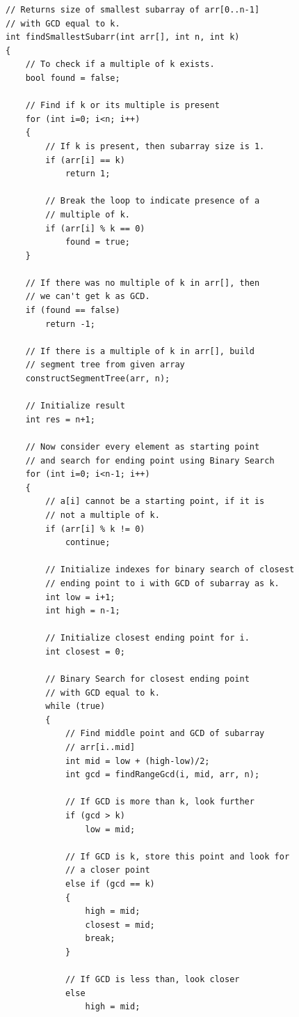 \documentclass[8pt, a4paper, oneside, twocolumn]{extarticle}
\begin{document}
\begin{verbatim}
// Returns size of smallest subarray of arr[0..n-1] 
// with GCD equal to k. 
int findSmallestSubarr(int arr[], int n, int k) 
{ 
    // To check if a multiple of k exists. 
    bool found = false; 
  
    // Find if k or its multiple is present 
    for (int i=0; i<n; i++) 
    { 
        // If k is present, then subarray size is 1. 
        if (arr[i] == k) 
            return 1; 
  
        // Break the loop to indicate presence of a 
        // multiple of k. 
        if (arr[i] % k == 0) 
            found = true; 
    } 
  
    // If there was no multiple of k in arr[], then 
    // we can't get k as GCD. 
    if (found == false) 
        return -1; 
  
    // If there is a multiple of k in arr[], build 
    // segment tree from given array 
    constructSegmentTree(arr, n); 
  
    // Initialize result 
    int res = n+1; 
  
    // Now consider every element as starting point 
    // and search for ending point using Binary Search 
    for (int i=0; i<n-1; i++) 
    { 
        // a[i] cannot be a starting point, if it is 
        // not a multiple of k. 
        if (arr[i] % k != 0) 
            continue; 
  
        // Initialize indexes for binary search of closest 
        // ending point to i with GCD of subarray as k. 
        int low = i+1; 
        int high = n-1; 
  
        // Initialize closest ending point for i. 
        int closest = 0; 
  
        // Binary Search for closest ending point 
        // with GCD equal to k. 
        while (true) 
        { 
            // Find middle point and GCD of subarray 
            // arr[i..mid] 
            int mid = low + (high-low)/2; 
            int gcd = findRangeGcd(i, mid, arr, n); 
  
            // If GCD is more than k, look further 
            if (gcd > k) 
                low = mid; 
  
            // If GCD is k, store this point and look for 
            // a closer point 
            else if (gcd == k) 
            { 
                high = mid; 
                closest = mid; 
                break; 
            } 
  
            // If GCD is less than, look closer 
            else
                high = mid; 
  

\end{verbatim}
\end{document}
